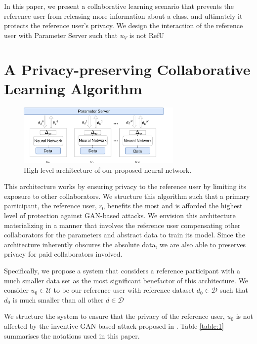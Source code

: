 \documentclass[conference]{IEEEtran}
\begin{document}
In this paper, we present a collaborative learning scenario that prevents the reference user from releasing more
information about a class, and ultimately it protects the reference user's privacy. We design the interaction of the reference user
with Parameter Server such that $u_V$ is not RefU

\section{A Privacy-preserving Collaborative Learning Algorithm}

\begin{figure}[!h]
\includegraphics[width=8cm, keepaspectratio]{HighLevelArch}
\caption{High level architecture of our proposed neural network.}
\label{fig:HighLevel}
\end{figure}

This architecture works by ensuring privacy to the reference user by limiting its exposure to other collaborators. We structure this algorithm such that a primary participant, the reference user, $r_0$ benefits the most and is afforded the highest level of protection against GAN-based attacks. We envision this architecture materializing in a manner that involves the reference user compensating other collaborators for the parameters and abstract data to train its model. Since the architecture inherently obscures the absolute data, we are also able to preserves privacy for paid collaborators involved.


Specifically, we propose a system that considers a reference participant with a much smaller data set as the most significant benefactor of this architecture. We consider $u_0\in\mathcal{U}$ to be our reference user with reference dataset $d_0\in\mathcal{D}$ such that $d_0$ is much smaller than all other $d \in\mathcal{D}$


We structure the system to ensure that the privacy of the reference
user, $u_0$ is not affected by the inventive GAN based attack proposed in \cite{hitaj2017deep}. Table \ref{table:1} summarises the notations used in this
paper.
\end{document}
